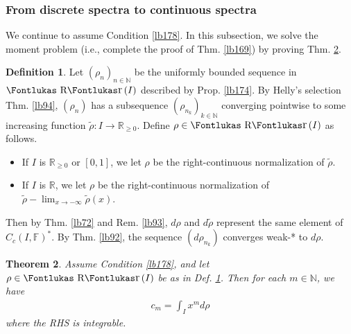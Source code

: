 \documentclass[12pt,b5paper,notitlepage]{article}
\theoremstyle{definition}
\newtheorem{df}{Definition}[section]
\theoremstyle{plain}
\newtheorem{thm}[df]{Theorem}
\DeclareMathOperator{\Rr}{\text{\Fontlukas R}\text{\kern -0pt {\Fontlukas\large r}}\,}
\newcommand{\wtd}{\widetilde}
\newcommand{\Nbb}{\mathbb N}
\newcommand{\Rbb}{\mathbb R}
\newcommand{\Fbb}{\mathbb F}
\numberwithin{equation}{section}
\begin{document}
\subsubsection{From discrete spectra to continuous spectra}\label{lb205}


We continue to assume Condition \ref{lb178}. In this subsection, we solve the moment problem (i.e., complete the proof of Thm. \ref{lb169}) by proving Thm. \ref{lb177}.


\begin{df}\label{lb175}
Let $(\rho_n)_{n\in\Nbb}$ be the uniformly bounded sequence in $\Rr(I)$ described by Prop. \ref{lb174}. By Helly's selection Thm. \ref{lb94}, $(\rho_n)$ has a subsequence $(\rho_{n_k})_{k\in\Nbb}$ converging pointwise to some increasing function $\wtd\rho:I\rightarrow\Rbb_{\geq0}$. Define $\rho\in\Rr(I)$ as follows.
\begin{itemize}
\item If $I$ is $\Rbb_{\geq0}$ or $[0,1]$, we let $\rho$ be the right-continuous normalization of $\wtd\rho$.
\item If $I$ is $\Rbb$, we let $\rho$ be the right-continuous normalization of $\wtd\rho-\lim_{x\rightarrow-\infty}\wtd\rho(x)$.
\end{itemize}
Then by Thm. \ref{lb72} and Rem. \ref{lb93}, $d\rho$ and $d\wtd\rho$ represent the same element of $C_c(I,\Fbb)^*$. By Thm. \ref{lb92}, the sequence $(d\rho_{n_k})$ converges weak-* to $d\rho$.
\end{df}


\begin{thm}\label{lb177}
Assume Condition \ref{lb178}, and let $\rho\in\Rr(I)$ be as in Def. \ref{lb175}. Then for each $m\in\Nbb$, we have
\begin{align*}
c_m=\int_I x^md\rho
\end{align*}
where the RHS is integrable.
\end{thm}
\end{document}

